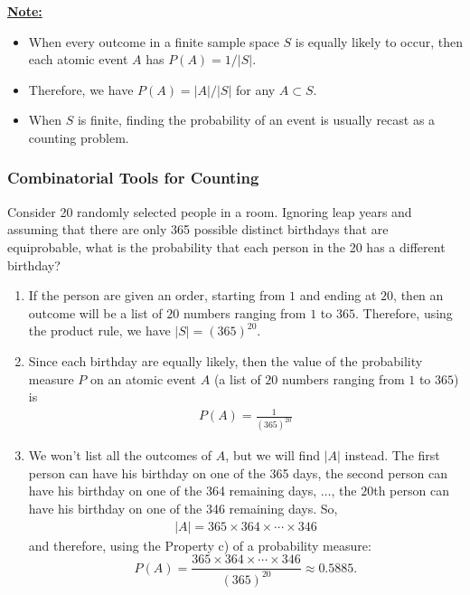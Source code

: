 \underline{\textbf{Note:}}
	\begin{itemize}
	\item When every outcome in a finite sample space $S$ is equally likely to occur, then each atomic event $A$ has $P (A) = 1/ |S|$.
	\item Therefore, we have $P (A) = |A| / |S|$ for any $A \subset S$.
	\item When $S$ is finite, finding the probability of an event is usually recast as a counting problem.
	\end{itemize}
	
\subsubsection{Combinatorial Tools for Counting}

\begin{example}
Consider 20 randomly selected people in a room. Ignoring leap years and assuming that there are only 365 possible distinct birthdays that are equiprobable, what is the probability that each person in the 20 has a different birthday?
\end{example}

\begin{sol*}
\begin{enumerate}[label=\Circled{\arabic*}]
\item If the person are given an order, starting from $1$ and ending at $20$, then an outcome will be a list of $20$ numbers ranging from $1$ to $365$. Therefore, using the product rule, we have $|S| = (365)^{20}$. 
\item Since each birthday are equally likely, then the value of the probability measure $P$ on an atomic event $A$ (a list of $20$ numbers ranging from $1$ to $365$) is
	\begin{align*}
	P (A) = \frac{1}{(365)^{20}}
	\end{align*}
\item We won't list all the outcomes of $A$, but we will find $|A|$ instead. The first person can have his birthday on one of the 365 days, the second person can have his birthday on one of the 364 remaining days, $\ldots$, the $20$th person can have his birthday on one of the 346 remaining days. So,
	\begin{align*}
	|A| = 365 \times 364 \times \cdots \times 346
	\end{align*}
and therefore, using the Property c) of a probability measure:
	\begin{equation*}
	P (A) = \frac{365 \times 364 \times \cdots \times 346}{(365)^{20}} \approx 0.5885 . \tag*{$\triangle$}
	\end{equation*}
\end{enumerate}
\end{sol*}

